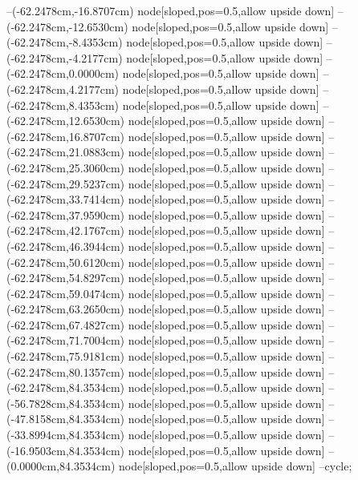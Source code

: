 --(-62.2478cm,-16.8707cm) node[sloped,pos=0.5,allow upside down]{\ArrowIn}
--(-62.2478cm,-12.6530cm) node[sloped,pos=0.5,allow upside down]{\ArrowIn}
--(-62.2478cm,-8.4353cm) node[sloped,pos=0.5,allow upside down]{\ArrowIn}
--(-62.2478cm,-4.2177cm) node[sloped,pos=0.5,allow upside down]{\ArrowIn}
--(-62.2478cm,0.0000cm) node[sloped,pos=0.5,allow upside down]{\ArrowIn}
--(-62.2478cm,4.2177cm) node[sloped,pos=0.5,allow upside down]{\ArrowIn}
--(-62.2478cm,8.4353cm) node[sloped,pos=0.5,allow upside down]{\ArrowIn}
--(-62.2478cm,12.6530cm) node[sloped,pos=0.5,allow upside down]{\ArrowIn}
--(-62.2478cm,16.8707cm) node[sloped,pos=0.5,allow upside down]{\ArrowIn}
--(-62.2478cm,21.0883cm) node[sloped,pos=0.5,allow upside down]{\ArrowIn}
--(-62.2478cm,25.3060cm) node[sloped,pos=0.5,allow upside down]{\ArrowIn}
--(-62.2478cm,29.5237cm) node[sloped,pos=0.5,allow upside down]{\ArrowIn}
--(-62.2478cm,33.7414cm) node[sloped,pos=0.5,allow upside down]{\ArrowIn}
--(-62.2478cm,37.9590cm) node[sloped,pos=0.5,allow upside down]{\ArrowIn}
--(-62.2478cm,42.1767cm) node[sloped,pos=0.5,allow upside down]{\ArrowIn}
--(-62.2478cm,46.3944cm) node[sloped,pos=0.5,allow upside down]{\ArrowIn}
--(-62.2478cm,50.6120cm) node[sloped,pos=0.5,allow upside down]{\ArrowIn}
--(-62.2478cm,54.8297cm) node[sloped,pos=0.5,allow upside down]{\ArrowIn}
--(-62.2478cm,59.0474cm) node[sloped,pos=0.5,allow upside down]{\ArrowIn}
--(-62.2478cm,63.2650cm) node[sloped,pos=0.5,allow upside down]{\ArrowIn}
--(-62.2478cm,67.4827cm) node[sloped,pos=0.5,allow upside down]{\ArrowIn}
--(-62.2478cm,71.7004cm) node[sloped,pos=0.5,allow upside down]{\ArrowIn}
--(-62.2478cm,75.9181cm) node[sloped,pos=0.5,allow upside down]{\ArrowIn}
--(-62.2478cm,80.1357cm) node[sloped,pos=0.5,allow upside down]{\ArrowIn}
--(-62.2478cm,84.3534cm) node[sloped,pos=0.5,allow upside down]{\ArrowIn}
--(-56.7828cm,84.3534cm) node[sloped,pos=0.5,allow upside down]{\ArrowIn}
--(-47.8158cm,84.3534cm) node[sloped,pos=0.5,allow upside down]{\ArrowIn}
--(-33.8994cm,84.3534cm) node[sloped,pos=0.5,allow upside down]{\ArrowIn}
--(-16.9503cm,84.3534cm) node[sloped,pos=0.5,allow upside down]{\ArrowIn}
--(0.0000cm,84.3534cm) node[sloped,pos=0.5,allow upside down]{\ArrowIn}
--cycle;
